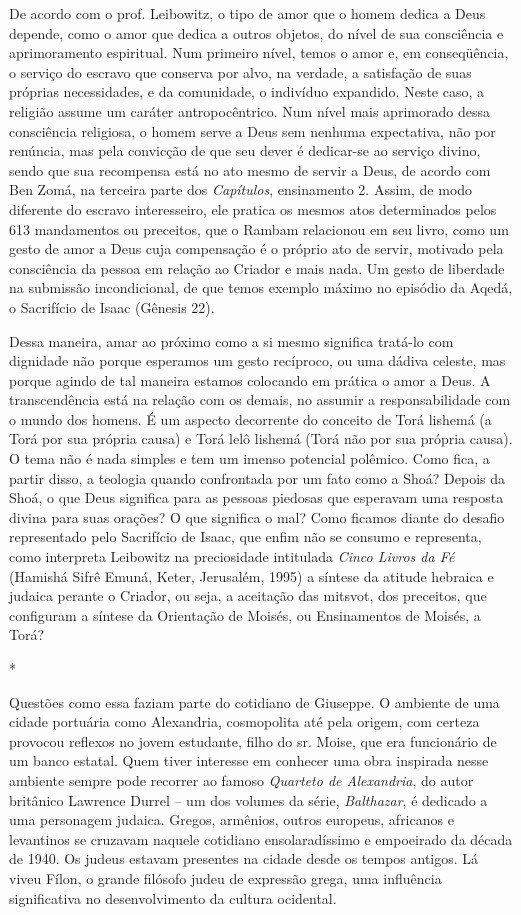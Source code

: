 De acordo com o prof. Leibowitz, o tipo de amor que o homem dedica a
Deus depende, como o amor que dedica a outros objetos, do nível de sua
consciência e aprimoramento espiritual. Num primeiro nível, temos o amor
e, em conseqüência, o serviço do escravo que conserva por alvo, na
verdade, a satisfação de suas próprias necessidades, e da comunidade, o
indivíduo expandido. Neste caso, a religião assume um caráter
antropocêntrico. Num nível mais aprimorado dessa consciência religiosa,
o homem serve a Deus sem nenhuma expectativa, não por renúncia, mas pela
convicção de que seu dever é dedicar-se ao serviço divino, sendo que sua
recompensa está no ato mesmo de servir a Deus, de acordo com Ben Zomá,
na terceira parte dos \emph{Capítulos}, ensinamento 2. Assim, de modo
diferente do escravo interesseiro, ele pratica os mesmos atos
determinados pelos 613 mandamentos ou preceitos, que o Rambam relacionou
em seu livro, como um gesto de amor a Deus cuja compensação é o próprio
ato de servir, motivado pela consciência da pessoa em relação ao Criador
e mais nada. Um gesto de liberdade na submissão incondicional, de que
temos exemplo máximo no episódio da Aqedá, o Sacrifício de Isaac
(Gênesis 22).

Dessa maneira, amar ao próximo como a si mesmo significa tratá-lo com
dignidade não porque esperamos um gesto recíproco, ou uma dádiva
celeste, mas porque agindo de tal maneira estamos colocando em prática o
amor a Deus. A transcendência está na relação com os demais, no assumir
a responsabilidade com o mundo dos homens. É um aspecto decorrente do
conceito de Torá lishemá (a Torá por sua própria causa) e Torá lelô
lishemá (Torá não por sua própria causa). O tema não é nada simples e
tem um imenso potencial polêmico. Como fica, a partir disso, a teologia
quando confrontada por um fato como a Shoá? Depois da Shoá, o que Deus
significa para as pessoas piedosas que esperavam uma resposta divina
para suas orações? O que significa o mal? Como ficamos diante do desafio
representado pelo Sacrifício de Isaac, que enfim não se consumo e
representa, como interpreta Leibowitz na preciosidade intitulada
\emph{Cinco Livros da Fé} (Hamishá Sifrê Emuná, Keter, Jerusalém, 1995)
a síntese da atitude hebraica e judaica perante o Criador, ou seja, a
aceitação das mitsvot, dos preceitos, que configuram a síntese da
Orientação de Moisés, ou Ensinamentos de Moisés, a Torá?

*

Questões como essa faziam parte do cotidiano de Giuseppe. O ambiente de
uma cidade portuária como Alexandria, cosmopolita até pela origem, com
certeza provocou reflexos no jovem estudante, filho do sr. Moise, que
era funcionário de um banco estatal. Quem tiver interesse em conhecer
uma obra inspirada nesse ambiente sempre pode recorrer ao famoso
\emph{Quarteto de Alexandria}, do autor britânico Lawrence Durrel -- um
dos volumes da série, \emph{Balthazar}, é dedicado a uma personagem
judaica. Gregos, armênios, outros europeus, africanos e levantinos se
cruzavam naquele cotidiano ensolaradíssimo e empoeirado da década de
1940. Os judeus estavam presentes na cidade desde os tempos antigos. Lá
viveu Fílon, o grande filósofo judeu de expressão grega, uma influência
significativa no desenvolvimento da cultura ocidental.

